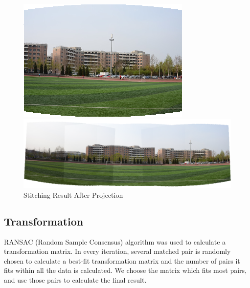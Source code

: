 \begin{enumerate}
\begin{figure}[H]
\begin{minipage}[b]{0.24\linewidth}
      \end{minipage}
      \begin{minipage}[b]{0.24\linewidth}
        \includegraphics[scale=0.3]{res/4.png}
      \end{minipage}

      \includegraphics[width=\textwidth]{res/warped_stitch.png}
      \caption{Stitching Result After Projection\label{fig:cyl}}
    \end{figure}

\end{enumerate}

\subsection{Transformation}
RANSAC (Random Sample Consensus) algorithm\cite{ransac} was used to calculate a transformation matrix.
In every iteration, several matched pair is randomly chosen to calculate a best-fit transformation matrix and
the number of pairs it fits within all the data is calculated.
We choose the matrix which fits most pairs, and use those pairs to calculate the final result.

